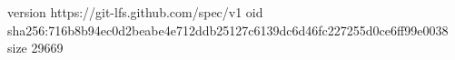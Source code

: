 version https://git-lfs.github.com/spec/v1
oid sha256:716b8b94ec0d2beabe4e712ddb25127c6139dc6d46fc227255d0ce6ff99e0038
size 29669
